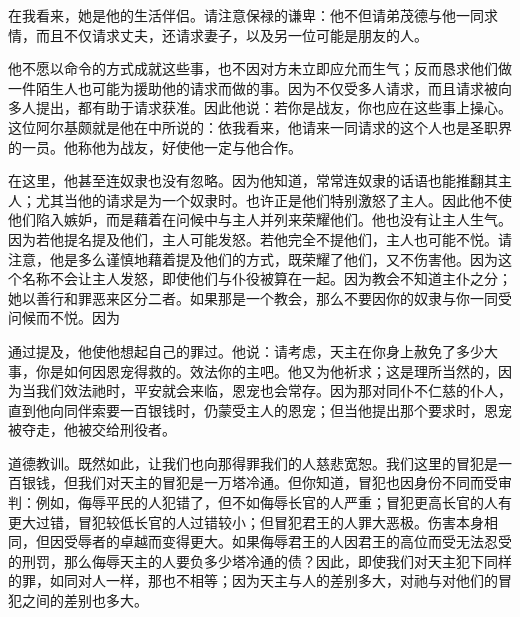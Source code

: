  \par

在我看来，她是他的生活伴侣。请注意保禄的谦卑：他不但请弟茂德与他一同求情，而且不仅请求丈夫，还请求妻子，以及另一位可能是朋友的人。\par

\par

他不愿以命令的方式成就这些事，也不因对方未立即应允而生气；反而恳求他们做一件陌生人也可能为援助他的请求而做的事。因为不仅受多人请求，而且请求被向多人提出，都有助于请求获准。因此他说：若你是战友，你也应在这些事上操心。这位阿尔基颇就是他在中所说的：依我看来，他请来一同请求的这个人也是圣职界的一员。他称他为战友，好使他一定与他合作。\par

\par

在这里，他甚至连奴隶也没有忽略。因为他知道，常常连奴隶的话语也能推翻其主人；尤其当他的请求是为一个奴隶时。也许正是他们特别激怒了主人。因此他不使他们陷入嫉妒，而是藉着在问候中与主人并列来荣耀他们。他也没有让主人生气。因为若他提名提及他们，主人可能发怒。若他完全不提他们，主人也可能不悦。请注意，他是多么谨慎地藉着提及他们的方式，既荣耀了他们，又不伤害他。因为这个名称不会让主人发怒，即使他们与仆役被算在一起。因为教会不知道主仆之分；她以善行和罪恶来区分二者。如果那是一个教会，那么不要因你的奴隶与你一同受问候而不悦。因为\par

\par

通过提及，他使他想起自己的罪过。他说：请考虑，天主在你身上赦免了多少大事，你是如何因恩宠得救的。效法你的主吧。他又为他祈求；这是理所当然的，因为当我们效法祂时，平安就会来临，恩宠也会常存。因为那对同仆不仁慈的仆人，直到他向同伴索要一百银钱时，仍蒙受主人的恩宠；但当他提出那个要求时，恩宠被夺走，他被交给刑役者。\par

道德教训。既然如此，让我们也向那得罪我们的人慈悲宽恕。我们这里的冒犯是一百银钱，但我们对天主的冒犯是一万塔冷通。但你知道，冒犯也因身份不同而受审判：例如，侮辱平民的人犯错了，但不如侮辱长官的人严重；冒犯更高长官的人有更大过错，冒犯较低长官的人过错较小；但冒犯君王的人罪大恶极。伤害本身相同，但因受辱者的卓越而变得更大。如果侮辱君王的人因君王的高位而受无法忍受的刑罚，那么侮辱天主的人要负多少塔冷通的债？因此，即使我们对天主犯下同样的罪，如同对人一样，那也不相等；因为天主与人的差别多大，对祂与对他们的冒犯之间的差别也多大。\par

